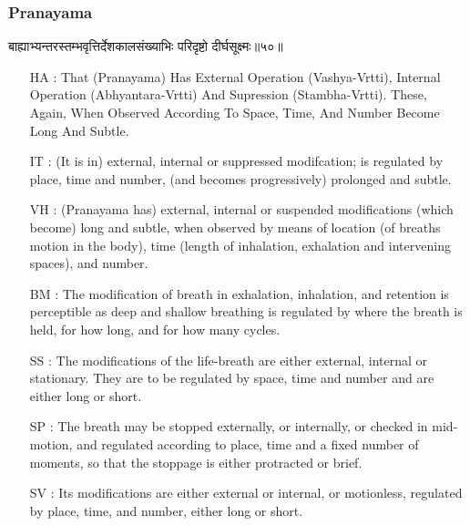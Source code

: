\begin{frame}[fragile]\frametitle{Pranayama}
\begin{sanskrit}
बाह्याभ्यन्तरस्तम्भवृत्तिर्देशकालसंख्याभिः परिदृष्टो दीर्घसूक्ष्मः॥५०॥
\end{sanskrit}

	\begin{itemize}
	\item [HA]: That (Pranayama) Has External Operation (Vashya-Vrtti), Internal Operation (Abhyantara-Vrtti) And Supression (Stambha-Vrtti). These, Again, When Observed According To Space, Time, And Number Become Long And Subtle.
	\item [IT]: (It is in) external, internal or suppressed modifcation; is regulated by place, time and number, (and becomes progressively) prolonged and subtle.
	\item [VH]: (Pranayama has) external, internal or suspended modifications (which become) long and subtle, when observed by means of location (of breaths motion in the body), time (length of inhalation, exhalation and intervening spaces), and number.
	\item [BM]: The modification of breath in exhalation, inhalation, and retention is perceptible as deep and shallow breathing is regulated by where the breath is held, for how long, and for how many cycles.
	\item [SS]: The modifications of the life-breath are either external, internal or stationary. They are to be regulated by space, time and number and are either long or short.
	\item [SP]: The breath may be stopped externally, or internally, or checked in mid-motion, and regulated according to place, time and a fixed number of moments, so that the stoppage is either protracted or brief.
	\item [SV]: Its modifications are either external or internal, or motionless, regulated by place, time, and number, either long or short. 
	\end{itemize}
\end{frame}


